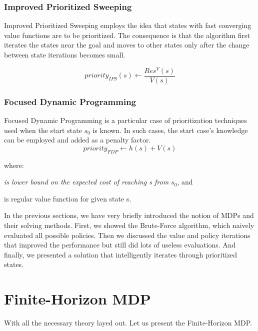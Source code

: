 \subsubsection{Improved Prioritized Sweeping}

Improved Prioritized Sweeping employs the idea that states with fast converging value functions are to be prioritized. The consequence is that the algorithm first iterates the states near the goal and moves to other states only after the change between state iterations becomes small.

\begin{equation}priority_{IPS} (s) \xleftarrow{} \frac{Res^{V} (s)}{V (s)} \end{equation}

\subsubsection{Focused Dynamic Programming}

Focused Dynamic Programming is a particular case of prioritization techniques used when the start state $s_0$ is known. In such cases, the start case's knowledge can be employed and added as a penalty factor.
\newpage
\begin{equation}priority_{FDP} \xleftarrow{} h(s) + V(s)\end{equation}


where:
\begin{description}[1cm]
  \item[h(s)] \textit{is lower bound on the expected cost of reaching s from $s_0$}, and
  \item[V(s)] is regular value function for given state s.
\end{description}

In the previous sections, we have very briefly introduced the notion of MDPs and their solving methods. First, we showed the Brute-Force algorithm, which naively evaluated all possible policies. Then we discussed the value and policy iterations that improved the performance but still did lots of useless evaluations. And finally, we presented a solution that intelligently iterates through prioritized states. 

\section{Finite-Horizon MDP}

With all the necessary theory layed out. Let us present the Finite-Horizon MDP.\\ \\

